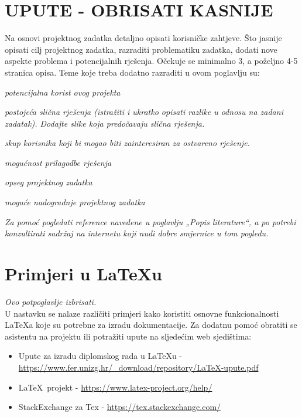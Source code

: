 		\section{UPUTE - OBRISATI KASNIJE}
		Na osnovi projektnog zadatka detaljno opisati korisničke zahtjeve. Što jasnije opisati cilj projektnog zadatka, razraditi problematiku zadatka, dodati nove aspekte problema i potencijalnih rješenja. Očekuje se minimalno 3, a poželjno 4-5 stranica opisa.	Teme koje treba dodatno razraditi u ovom poglavlju su:
		\begin{packed_item}
			\item \textit{potencijalna korist ovog projekta}
			\item \textit{postojeća slična rješenja (istražiti i ukratko opisati razlike u odnosu na zadani zadatak). Dodajte slike koja predočavaju slična rješenja.}
			\item \textit{skup korisnika koji bi mogao biti zainteresiran za ostvareno rješenje.}
			\item \textit{mogućnost prilagodbe rješenja }
			\item \textit{opseg projektnog zadatka}
			\item \textit{moguće nadogradnje projektnog zadatka}
		\end{packed_item}
		
		\textit{Za pomoć pogledati reference navedene u poglavlju „Popis literature“, a po potrebi konzultirati sadržaj na internetu koji nudi dobre smjernice u tom pogledu.}
		\eject
		
		\section{Primjeri u \LaTeX u}
		
		\textit{Ovo potpoglavlje izbrisati.}\\

		U nastavku se nalaze različiti primjeri kako koristiti osnovne funkcionalnosti \LaTeX a koje su potrebne za izradu dokumentacije. Za dodatnu pomoć obratiti se asistentu na projektu ili potražiti upute na sljedećim web sjedištima:
		\begin{itemize}
			\item Upute za izradu diplomskog rada u \LaTeX u - \url{https://www.fer.unizg.hr/_download/repository/LaTeX-upute.pdf}
			\item \LaTeX\ projekt - \url{https://www.latex-project.org/help/}
			\item StackExchange za Tex - \url{https://tex.stackexchange.com/}\\
		
		\end{itemize} 	


